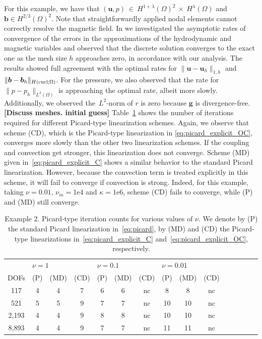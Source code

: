 \documentclass{siamltex}
\newcommand{\uu}[1]{\boldsymbol #1}                     %
\newcommand{\curl}{\rm curl}
\begin{document}
For this example, we have that
$(\uu{u},p)~\in~H^{1+\lambda}(\Omega)^2~\times~ H^{\lambda}(\Omega)$
and $\uu{b} \in H^{2/3}(\Omega)^2$. Note that straightforwardly
applied nodal elements cannot correctly resolve the magnetic field.
In \cite{XXX} we
investigated the asymptotic rates of convergence of the errors in the
approximations of the hydrodynamic and magnetic variables and
observed that the discrete solution converges to the exact one as the
mesh size $h$ approaches zero, in accordance with our analysis. The results showed full agreement with the
optimal rates for $\| \uu{u}-\uu{u}_h \|_{1,h}$ and~$\|
\uu{b}-\uu{b}_h \|_{H(\curl;\Omega)}$. For the pressure, we also observed
that the rate for $\|p-p_h\|_{L^2(\Omega)}$ is approaching the
optimal rate, albeit more slowly. Additionally, we observed
the~$L^2$-norm of $r$ is zero because $\uu{g}$ is divergence-free.
{\bf [Discuss meshes. initial guess]}
Table~\ref{tab:singular_picard} shows the number of iterations required for different Picard-type linearization schemes. Again, we observe that scheme (CD), which is the Picard-type linearization in \eqref{eq:picard_explicit_OC}, converges more slowly than the other two linearization schemes. If the coupling and convection get stronger, this linearization does not converge.
Scheme (MD) given in~\eqref{eq:picard_explicit_C} shows a similar behavior to the standard Picard linearization. However, because the convection term is treated explicitly in this scheme, it will fail to converge if convection is strong. Indeed, for this example, taking $\nu = 0.01$, $\nu_m = 1\mathrm{e}4$ and $\kappa = 1\mathrm{e}6$, scheme (CD) fails to converge, while (P) and (MD) still converge.

\begin{table}[!ht]
\begin{center}
\begin{tabular}{ccccccccccccccc}
\hline
&\multicolumn{3}{l}{$\nu = 1$} & \multicolumn{3}{l}{$\nu = 0.1$} & \multicolumn{3}{l}{$\nu = 0.01$} \\
 DOFs& (P) & (MD) & (CD) & (P) & (MD) & (CD) & (P) & (MD) & (CD) \\
\hline
117 & 4 & 4 & 7 & 6 & 6 & nc & 8 & 8 & nc \\
521 & 5 & 5 & 9 & 7 & 7 & nc & 10 & 10 & nc \\
2,193 & 4 & 4 & 9 & 8 & 8 & nc & 10 & 10 & nc \\
8,893 & 4 & 4 & 9 & 7 & 7 & nc & 11 & 11 & nc \\
\hline
\end{tabular}
\caption{Example 2. Picard-type iteration counts for various values of $\nu$. We denote by (P) the standard Picard linearization in~\eqref{eq:picard}, by (MD) and (CD) the Picard-type linearizations in~\eqref{eq:picard_explicit_C} and~\eqref{eq:picard_explicit_OC}, respectively.}
\label{tab:singular_picard}
\end{center}
\end{table}
\end{document}
